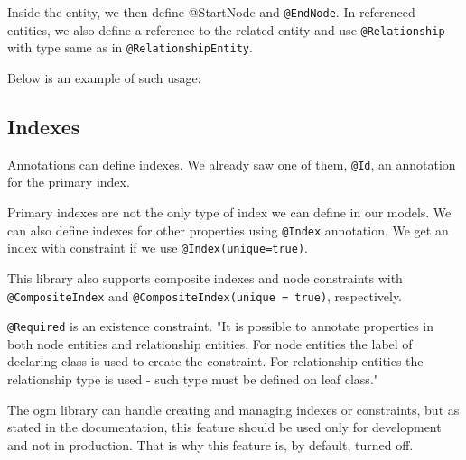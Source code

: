 Inside the entity, we then define @StartNode and \texttt{@EndNode}. In referenced entities, we also define a reference to
the related entity and use \texttt{@Relationship} with type same as in \texttt{@RelationshipEntity}.

Below is an example of such usage:


\subsection {Indexes}

Annotations can define indexes. We already saw one of them, \texttt{@Id}, an annotation for the primary index.

Primary indexes are not the only type of index we can define in our models. We can also define indexes for other
properties using \texttt{@Index} annotation. We get an index with constraint if we use \texttt{@Index(unique=true)}.

This library also supports composite indexes and node constraints with \texttt{@CompositeIndex} and \texttt{@CompositeIndex(unique = true)}, respectively.

\texttt{@Required} is an existence constraint. "It is possible to annotate properties in both node entities and relationship entities. For node entities
the label of declaring class is used to create the constraint. For relationship entities the relationship type is used - such type must
be defined on leaf class." \cite{noauthor_reference_nodate}

The \acrshort{ogm} library can handle creating and managing indexes or constraints, but as stated in the documentation, this feature should be used only for development
and not in production. That is why this feature is, by default, turned off.



